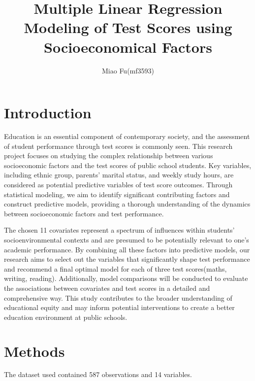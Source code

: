 \documentclass[
  12pt,
]{article}
\title{Multiple Linear Regression Modeling of Test Scores using
Socioeconomical Factors}
\author{Miao Fu(mf3593)}
\date{}
\begin{document}
\maketitle

\hypertarget{introduction}{%
\section{Introduction}\label{introduction}}

Education is an essential component of contemporary society, and the
assessment of student performance through test scores is commonly seen.
This research project focuses on studying the complex relationship
between various socioeconomic factors and the test scores of public
school students. Key variables, including ethnic group, parents' marital
status, and weekly study hours, are considered as potential predictive
variables of test score outcomes. Through statistical modeling, we aim
to identify significant contributing factors and construct predictive
models, providing a thorough understanding of the dynamics between
socioeconomic factors and test performance.

The chosen 11 covariates represent a spectrum of influences within
students' socioenvironmental contexts and are presumed to be potentially
relevant to one's academic performance. By combining all these factors
into predictive models, our research aims to select out the variables
that significantly shape test performance and recommend a final optimal
model for each of three test scores(maths, writing, reading).
Additionally, model comparisons will be conducted to evaluate the
associations between covariates and test scores in a detailed and
comprehensive way. This study contributes to the broader understanding
of educational equity and may inform potential interventions to create a
better education environment at public schools.

\hypertarget{methods}{%
\section{Methods}\label{methods}}

The dataset used contained 587 observations and 14 variables.
\end{document}
